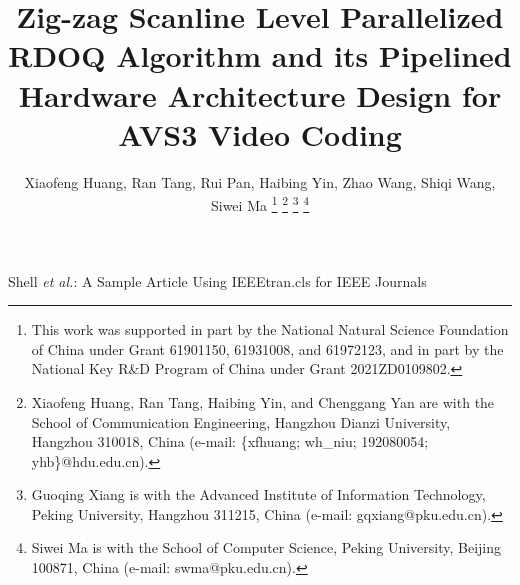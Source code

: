 \documentclass[lettersize,journal]{IEEEtran}
\begin{document}
\title{Zig-zag Scanline Level Parallelized RDOQ Algorithm and its Pipelined Hardware Architecture Design for AVS3 Video Coding}

\author{Xiaofeng Huang, Ran Tang, Rui Pan, Haibing Yin, Zhao Wang, Shiqi Wang, Siwei Ma
\thanks{This work was supported in part by the National Natural Science Foundation of China under Grant 61901150, 61931008, and 61972123, and in part by the National Key R\&D Program of China under Grant 2021ZD0109802.}%
\thanks{Xiaofeng Huang, Ran Tang, Haibing Yin, and Chenggang Yan are
with the School of Communication Engineering, Hangzhou Dianzi University,
Hangzhou 310018, China (e-mail: \{xfhuang; wh\_niu; 192080054; yhb\}@hdu.edu.cn).}
\thanks{Guoqing Xiang is with the Advanced Institute of Information Technology, Peking University,
Hangzhou 311215, China (e-mail: gqxiang@pku.edu.cn).}
\thanks{Siwei Ma is with the School of Computer Science, Peking University,
Beijing 100871, China (e-mail: swma@pku.edu.cn).}
}

%
{Shell \MakeLowercase{\textit{et al.}}: A Sample Article Using IEEEtran.cls for IEEE Journals}


\maketitle
\end{document}
